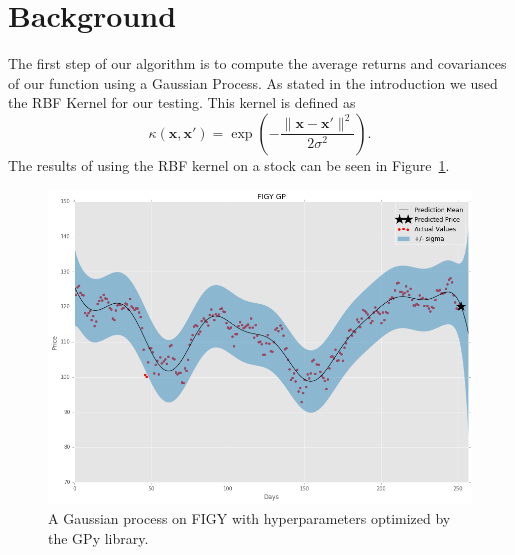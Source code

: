 \documentclass{article}
\begin{document}
\section{Background}
\label{background}
The first step of our algorithm is to compute the average returns and covariances of our function using a Gaussian Process.  As stated in the introduction we used the RBF Kernel for our testing.  This kernel is defined as 
\begin{equation}
	\kappa (\textbf{x}, \textbf{x}') = \exp \left( - \frac{\|\textbf{x} - \textbf{x}' \|^2}{2\sigma^2} \right).
    \label{eqn:RBF}
\end{equation}
The results of using the RBF kernel on a stock can be seen in Figure~\ref{fig:GP}.

\begin{figure}[H]
  \includegraphics[scale=.5]{figy.png}
  \caption{A Gaussian process on FIGY with hyperparameters optimized by the GPy library.}
  \label{fig:GP}
\end{figure}
\end{document}
